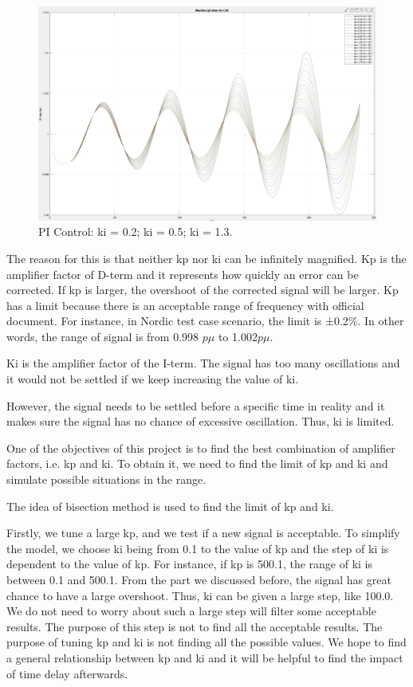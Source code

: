 \begin{figure}[!htbp]
%
  \includegraphics[width= \linewidth]{figure/3_4_1_tune_ki_3.jpeg}
\endminipage
\caption{PI Control: ki = 0.2; ki = 0.5; ki = 1.3.}
\label{3_4_1_larger_ki}
\end{figure}


The reason for this is that neither kp nor ki can be infinitely magnified. Kp is the amplifier factor of D-term and it represents how quickly an error can be corrected. If kp is larger, the overshoot of the corrected signal will be larger. Kp has a limit because there is an acceptable range of frequency with official document. For instance, in Nordic test case scenario, the limit is ±0.2\%. In other words, the range of signal is from 0.998 $p\mu$ to 1.002$p\mu$. 

Ki is the amplifier factor of the I-term. The signal has too many oscillations and it would not be settled if we keep increasing the value of ki.

However, the signal needs to be settled before a specific time in reality and it makes sure the signal has no chance of excessive oscillation. Thus, ki is limited. 

One of the objectives of this project is to find the best combination of amplifier factors, i.e. kp and ki. To obtain it, we need to find the limit of kp and ki and simulate possible situations in the range. 

The idea of bisection method is used to find the limit of kp and ki. 

Firstly, we tune a large kp, and we test if a new signal is acceptable. To simplify the model, we choose ki being from 0.1 to the value of kp and the step of ki is dependent to the value of kp. For instance, if kp is 500.1, the range of ki is between 0.1 and 500.1. From the part we discussed before, the signal has great chance to have a large overshoot. Thus, ki can be given a large step, like 100.0. We do not need to worry about such a large step will filter some acceptable results. The purpose of this step is not to find all the acceptable results. The purpose of tuning kp and ki is not finding all the possible values. We hope to find a general relationship between kp and ki and it will be helpful to find the impact of time delay afterwards. 

